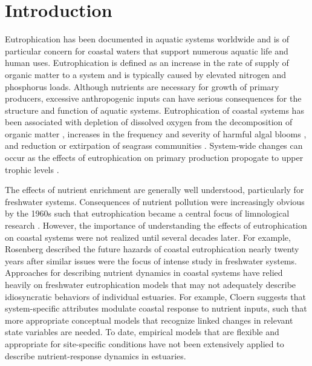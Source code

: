 \documentclass{svjour3}\usepackage[]{graphicx}\usepackage[]{color}
\begin{document}
\linenumbers

\acresetall
\section{Introduction} \label{intro}

Eutrophication has been documented in aquatic systems worldwide and is of particular concern for coastal waters that support numerous aquatic life and human uses.  Eutrophication is defined as an increase in the rate of supply of organic matter to a system \cite{Nixon95} and is typically caused by elevated nitrogen and phosphorus loads.  Although nutrients are necessary for growth of primary producers, excessive anthropogenic inputs can have serious consequences for the structure and function of aquatic systems.  Eutrophication of coastal systems has been associated with depletion of dissolved oxygen from the decomposition of organic matter \cite{Diaz08}, increases in the frequency and severity of harmful algal blooms \cite{Glibert13}, and reduction or extirpation of seagrass communities \cite{Duarte95,Tomasko05}.  System-wide changes can occur as the effects of eutrophication on primary production propogate to upper trophic levels \cite{Powers05}. 

The effects of nutrient enrichment are generally well understood, particularly for freshwater systems. Consequences of nutrient pollution were increasingly obvious by the 1960s such that eutrophication became a central focus of limnological research \cite{Cloern01}.  However, the importance of understanding the effects of eutrophication on coastal systems were not realized until several decades later.  For example, Rosenberg \cite{Rosenberg85} described the future hazards of coastal eutrophication nearly twenty years after similar issues were the focus of intense study in freshwater systems.  Approaches for describing nutrient dynamics in coastal systems have relied heavily on freshwater eutrophication models that may not adequately describe idiosyncratic behaviors of individual estuaries.  For example, Cloern \cite{Cloern01} suggests that system-specific attributes modulate coastal response to nutrient inputs, such that more appropriate conceptual models that recognize linked changes in relevant state variables are needed.  To date, empirical models that are flexible and appropriate for site-specific conditions have not been extensively applied to describe nutrient-response dynamics in estuaries.
\end{document}
